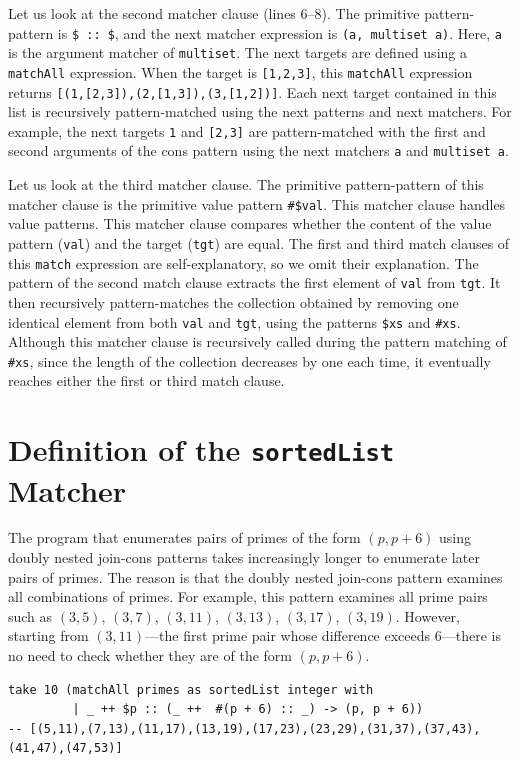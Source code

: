 Let us look at the second matcher clause (lines 6--8).
The primitive pattern-pattern is \lstinline{$ :: $}, and the next matcher expression is \lstinline{(a, multiset a)}.
Here, \lstinline{a} is the argument matcher of \lstinline{multiset}.
The next targets are defined using a \lstinline{matchAll} expression.
When the target is \lstinline{[1,2,3]}, this \lstinline{matchAll} expression returns \lstinline{[(1,[2,3]),(2,[1,3]),(3,[1,2])]}.
Each next target contained in this list is recursively pattern-matched using the next patterns and next matchers.
For example, the next targets \lstinline{1} and \lstinline{[2,3]} are pattern-matched with the first and second arguments of the cons pattern using the next matchers \lstinline{a} and \lstinline{multiset a}.

Let us look at the third matcher clause.
The primitive pattern-pattern of this matcher clause is the primitive value pattern \lstinline|#$val|.
This matcher clause handles value patterns.
This matcher clause compares whether the content of the value pattern (\lstinline{val}) and the target (\lstinline{tgt}) are equal.
The first and third match clauses of this \lstinline{match} expression are self-explanatory, so we omit their explanation.
The pattern of the second match clause extracts the first element of \lstinline{val} from \lstinline{tgt}.
It then recursively pattern-matches the collection obtained by removing one identical element from both \lstinline{val} and \lstinline{tgt}, using the patterns \lstinline{$xs} and \lstinline{#xs}.
Although this matcher clause is recursively called during the pattern matching of \lstinline{#xs}, since the length of the collection decreases by one each time, it eventually reaches either the first or third match clause.

\section{Definition of the \texttt{sortedList} Matcher}\label{matcher-sorted}

The program that enumerates pairs of primes of the form $(p,p+6)$ using doubly nested join-cons patterns takes increasingly longer to enumerate later pairs of primes.
The reason is that the doubly nested join-cons pattern examines all combinations of primes.
For example, this pattern examines all prime pairs such as $(3,5)$, $(3,7)$, $(3,11)$, $(3,13)$, $(3, 17)$, $(3,19)$.
However, starting from $(3,11)$---the first prime pair whose difference exceeds $6$---there is no need to check whether they are of the form $(p,p+6)$.
\begin{lstlisting}[language=egison,numbers=none]
take 10 (matchAll primes as sortedList integer with
         | _ ++ $p :: (_ ++  #(p + 6) :: _) -> (p, p + 6))
-- [(5,11),(7,13),(11,17),(13,19),(17,23),(23,29),(31,37),(37,43),(41,47),(47,53)]
\end{lstlisting}

